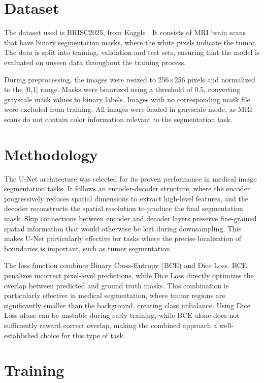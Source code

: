 \documentclass[conference]{IEEEtran}
\begin{document}
\section{Dataset}

The dataset used is BRISC2025, from Kaggle \cite{brisc}. It consists of MRI brain scans that have binary segmentation masks, where the white pixels indicate the tumor. The data is split into training, validation and test sets, ensuring that the model is evaluated on unseen data throughout the training process.

During preprocessing, the images were resized to 256$\times$256 pixels and normalized to the [0,1] range. Masks were binarized using a threshold of 0.5, converting grayscale mask values to binary labels. Images with no corresponding mask file were excluded from training. All images were loaded in grayscale mode, as MRI scans do not contain color information relevant to the segmentation task.

\section{Methodology}

The U-Net architecture \cite{unet} was selected for its proven performance in medical image segmentation tasks. It follows an encoder-decoder structure, where the encoder progressively reduces spatial dimensions to extract high-level features, and the decoder reconstructs the spatial resolution to produce the final segmentation mask. Skip connections between encoder and decoder layers preserve fine-grained spatial information that would otherwise be lost during downsampling. This makes U-Net particularly effective for tasks where the precise localization of boundaries is important, such as tumor segmentation.

The loss function combines Binary Cross-Entropy (BCE) and Dice Loss. BCE penalizes incorrect pixel-level predictions, while Dice Loss directly optimizes the overlap between predicted and ground truth masks. This combination is particularly effective in medical segmentation, where tumor regions are significantly smaller than the background, creating class imbalance. Using Dice Loss alone can be unstable during early training, while BCE alone does not sufficiently reward correct overlap, making the combined approach a well-established choice for this type of task.

\section{Training}
\end{document}
